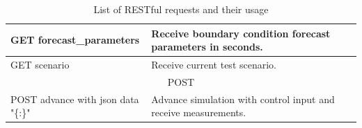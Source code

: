 \documentclass{article}
\begin{document}
\begin{table}
{\begin{tabular}{p{150pt}|p{150pt}}
\hline
GET forecast\_parameters                                                                                                                               & Receive boundary condition forecast parameters in seconds.                                                                                                                   \\
\hline
GET scenario                                                                                                                                           & Receive current test scenario.                                                                                                                                               \\
\hline
\multicolumn{2}{c}{POST}                                                                                                                                                                                                                                                                                                              \\
\hline
POST advance with json data "\{:\}"                                                                                                                    & Advance simulation with control input and receive measurements.              \bottomrule                                                                                               
\end{tabular}}
\caption{List of RESTful requests and their usage}
\label{tab:restful}
\end{table}

\begin{table}\tiny
{}
\caption{List of useful methods for interacting with the Alfalfa API}
\label{tab:alfalfaapi}
\end{table}
\end{document}
